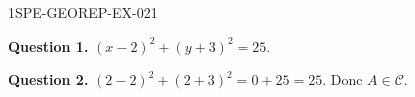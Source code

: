 \begin{corrige}{1SPE-GEOREP-EX-021}

\textbf{Question 1.} $(x - 2)^2 + (y + 3)^2 = 25$.

\textbf{Question 2.} $(2 - 2)^2 + (2 + 3)^2 = 0 + 25 = 25$. Donc $A \in \mathcal{C}$.

\end{corrige}
